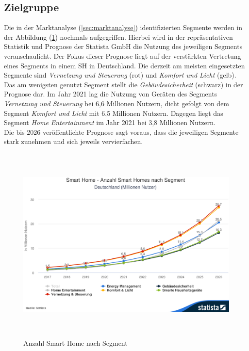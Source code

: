     \subsection{Zielgruppe} %
        Die in der Marktanalyse (\ref{sec:marktanalyse}) identifizierten Segmente werden in der Abbildung 
        (\ref{pic:segments}) nochmals aufgegriffen. Hierbei wird in der repräsentativen Statistik und Prognose der 
        Statista GmbH die Nutzung des jeweiligen Segments veranschaulicht. Der Fokus dieser Prognose liegt 
        auf der verstärkten Vertretung eines Segments in einem \acl{SH} in Deutschland. Die derzeit am meisten eingesetzten 
        Segmente sind \textit{Vernetzung und Steuerung} (rot) und \textit{Komfort und Licht} 
        (gelb). Das am wenigsten genutzt Segment stellt die \textit{Gebäudesicherheit} 
        (schwarz) in der Prognose dar. Im Jahr 2021 lag die Nutzung von Geräten des Segments \textit{Vernetzung und Steuerung} 
        bei 6,6 Millionen Nutzern, dicht gefolgt von dem Segment \textit{Komfort und Licht} mit 
        6,5 Millionen Nutzern. Dagegen liegt das Segment \textit{Home Entertainment} im Jahr 2021 bei 3,8 Millionen Nutzern.
        \\
        \linebreak
        Die bis 2026 veröffentlichte Prognose sagt voraus, dass die jeweiligen Segmente stark zunehmen %
        und sich jeweils vervierfachen.  
        \begin{figure}[hbt!]
            \centering
            \includegraphics[width=15cm,height=10cm,keepaspectratio]{images/Statista-Outlook-Smart-Home---Anzahl-Smart-Homes-nach-Segment-Deutschland-Millionen-Nutzer.png}
            \caption{Anzahl Smart Home nach Segment \cite{statista2021}} 
            \label{pic:segments}
        \end{figure}
